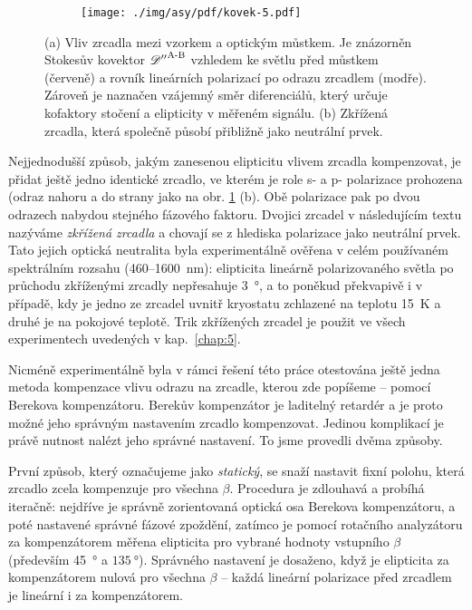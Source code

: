 \begin{figure}[htbp]
    \centering
    \begin{subfigure}{.6\textwidth}
        \centering
        \texttt{[image: ./img/asy/pdf/kovek-5.pdf]}
    \end{subfigure}
    \begin{subfigure}{.3\textwidth}
        \centering
    \end{subfigure}
\caption{(a) Vliv zrcadla mezi vzorkem a optickým můstkem. Je znázorněn Stokesův kovektor ${\mathscr{D}''}^\textrm{A-B}$ vzhledem ke světlu před můstkem (červeně) a rovník lineárních polarizací po odrazu zrcadlem (modře). Zároveň je naznačen vzájemný směr diferenciálů, který určuje kofaktory stočení a elipticity v měřeném signálu. (b) Zkřížená zrcadla, která společně působí přibližně jako neutrální prvek.}
    \label{fig:mustek-zrcadlo-data}
\end{figure}

Nejjednodušší způsob, jakým zanesenou elipticitu vlivem zrcadla kompenzovat, je přidat ještě jedno identické zrcadlo, ve kterém je role s- a p- polarizace prohozena (odraz nahoru a do strany jako na obr. \ref{fig:mustek-zrcadlo-data} (b).
Obě polarizace pak po dvou odrazech nabydou stejného fázového faktoru.
Dvojici zrcadel v následujícím textu nazýváme \emph{zkřížená zrcadla} a chovají se z hlediska polarizace jako neutrální prvek.
Tato jejich optická neutralita byla experimentálně ověřena v celém používaném spektrálním rozsahu (460--\SI{1600}{\nano\meter}): elipticita lineárně polarizovaného světla po průchodu zkříženými zrcadly nepřesahuje \SI{3}{\degree}, a to poněkud překvapivě i v případě, kdy je jedno ze zrcadel uvnitř kryostatu zchlazené na teplotu \SI{15}{\kelvin} a druhé je na pokojové teplotě.
Trik zkřížených zrcadel je použit ve všech experimentech uvedených v kap.~\ref{chap:5}.

Nicméně experimentálně byla v rámci řešení této práce otestována ještě jedna metoda kompenzace vlivu odrazu na zrcadle, kterou zde popíšeme -- pomocí Berekova kompenzátoru.
Berekův kompenzátor je laditelný retardér a je proto možné jeho správným nastavením zrcadlo kompenzovat.
Jedinou komplikací je právě nutnost nalézt jeho správné nastavení.
To jsme provedli dvěma způsoby.

První způsob, který označujeme jako \emph{statický}, se snaží nastavit fixní polohu, která zrcadlo zcela kompenzuje pro všechna $\beta$.
Procedura je zdlouhavá a probíhá iteračně: nejdříve je správně zorientovaná optická osa Berekova kompenzátoru, a poté nastavené správné fázové zpoždění, zatímco je pomocí rotačního analyzátoru za kompenzátorem měřena elipticita pro vybrané hodnoty vstupního $\beta$ (především \SI{45}{\degree} a $\SI{135}{\degree}$).
Správného nastavení je dosaženo, když je elipticita za kompenzátorem nulová pro všechna $\beta$ -- každá lineární polarizace před zrcadlem je lineární i za kompenzátorem.

